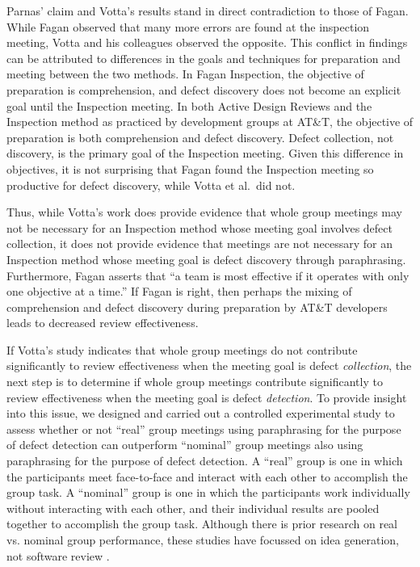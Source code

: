 Parnas' claim and Votta's results stand in direct contradiction to those of
Fagan.  While Fagan observed that many more errors are found at the
inspection meeting, Votta and his colleagues observed the opposite. 
This conflict in findings can be attributed to differences in the goals
and techniques for preparation and meeting between the two methods.  In
Fagan Inspection, the objective of preparation is comprehension, and defect
discovery does not become an explicit goal until the Inspection meeting. In
both Active Design Reviews and the Inspection method as practiced by development
groups at AT\&T, the objective of preparation is both comprehension and
defect discovery. Defect collection, not discovery, is the primary goal
of the Inspection meeting.  Given this difference in objectives, it is not
surprising that Fagan found the Inspection meeting so productive for defect
discovery, while Votta et al.~did not.

Thus, while Votta's work does provide evidence that whole group meetings
may not be necessary for an Inspection method whose meeting goal involves
defect collection, it does not provide evidence that meetings are not
necessary for an Inspection method whose meeting goal is defect discovery
through paraphrasing. Furthermore, Fagan asserts that ``a team is most
effective if it operates with only one objective at a time.''  If Fagan is
right, then perhaps the mixing of comprehension and defect discovery during
preparation by AT\&T developers leads to decreased review effectiveness.

If Votta's study indicates that whole group meetings do not contribute
significantly to review effectiveness when the meeting goal is defect {\em
  collection}, the next step is to determine if whole group meetings
contribute significantly to review effectiveness when the meeting goal is
defect {\em detection}.  To provide insight into this issue, we designed
and carried out a controlled experimental study to assess whether or not
``real'' group meetings using paraphrasing for the purpose of defect
detection can outperform ``nominal'' group meetings also using paraphrasing
for the purpose of defect detection.  A ``real'' group is one in which the
participants meet face-to-face and interact with each other to accomplish
the group task. A ``nominal'' group is one in which the participants work
individually without interacting with each other, and their individual
results are pooled together to accomplish the group task.  Although there
is prior research on real vs. nominal group performance, these studies have
focussed on idea generation, not software review \cite{Diehl87,Mullen91}.

